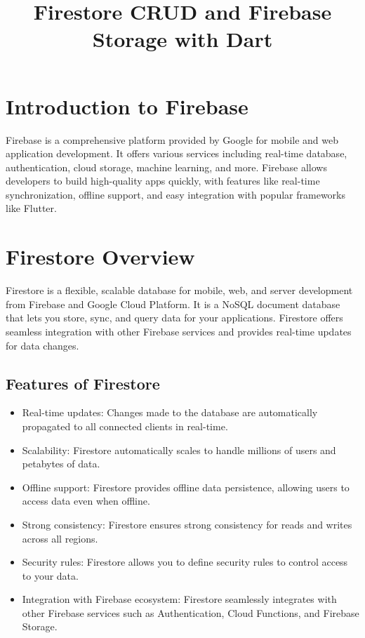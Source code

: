 \documentclass[12pt]{article}
\title{Firestore CRUD and Firebase Storage with Dart}
\begin{document}
\maketitle

\tableofcontents

\newpage

\section{Introduction to Firebase}
Firebase is a comprehensive platform provided by Google for mobile and web application development. It offers various services including real-time database, authentication, cloud storage, machine learning, and more. Firebase allows developers to build high-quality apps quickly, with features like real-time synchronization, offline support, and easy integration with popular frameworks like Flutter.

\section{Firestore Overview}
Firestore is a flexible, scalable database for mobile, web, and server development from Firebase and Google Cloud Platform. It is a NoSQL document database that lets you store, sync, and query data for your applications. Firestore offers seamless integration with other Firebase services and provides real-time updates for data changes.

\subsection{Features of Firestore}
\begin{itemize}
    \item Real-time updates: Changes made to the database are automatically propagated to all connected clients in real-time.
    \item Scalability: Firestore automatically scales to handle millions of users and petabytes of data.
    \item Offline support: Firestore provides offline data persistence, allowing users to access data even when offline.
    \item Strong consistency: Firestore ensures strong consistency for reads and writes across all regions.
    \item Security rules: Firestore allows you to define security rules to control access to your data.
    \item Integration with Firebase ecosystem: Firestore seamlessly integrates with other Firebase services such as Authentication, Cloud Functions, and Firebase Storage.
\end{itemize}
\end{document}
